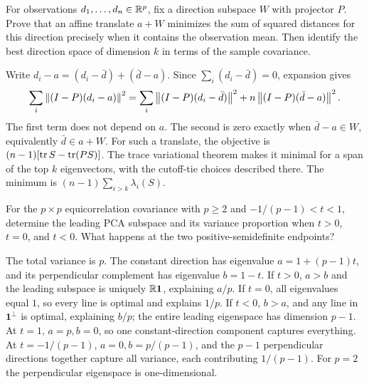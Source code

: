 \begin{problem}
For observations $d_1,\ldots,d_n\in\mathbb R^p$, fix a direction subspace $W$
with projector $P$. Prove that an affine translate $a+W$ minimizes the
sum of squared distances for this direction precisely when it contains
the observation mean. Then identify the best direction space of dimension
$k$ in terms of the sample covariance.
\end{problem}
\begin{solution}
Write $d_i-a=(d_i-\bar d)+(\bar d-a)$.
Since $\sum_i(d_i-\bar d)=0$, expansion gives
\[
\sum_i\left\lVert(I-P)(d_i-a)\right\rVert^2
=\sum_i\left\lVert(I-P)(d_i-\bar d)\right\rVert^2
+n\left\lVert(I-P)(\bar d-a)\right\rVert^2.
\]
The first term does not depend on $a$. The second is zero exactly when
$\bar d-a\in W$, equivalently $\bar d\in a+W$.
For such a translate, the objective is
$(n-1)[\operatorname{tr} S-\operatorname{tr}(PS)]$.
The trace variational theorem makes it minimal for a span of the top
$k$ eigenvectors, with the cutoff-tie choices described there.
The minimum is $(n-1)\sum_{i>k}\lambda_i(S)$.
\end{solution}

\begin{problem}
For the $p\times p$ equicorrelation covariance with $p\geqslant2$ and
$-1/(p-1)<t<1$, determine the leading PCA subspace and its variance
proportion when $t>0$, $t=0$, and $t<0$. What happens at the two
positive-semidefinite endpoints?
\end{problem}
\begin{solution}
The total variance is $p$. The constant direction has eigenvalue
$a=1+(p-1)t$, and its perpendicular complement has eigenvalue $b=1-t$.
If $t>0$, $a>b$ and the leading subspace is uniquely
$\mathbb R\mathbf1$, explaining $a/p$.
If $t=0$, all eigenvalues equal $1$, so every line is optimal and explains
$1/p$. If $t<0$, $b>a$, and any line in $\mathbf1^\perp$ is optimal,
explaining $b/p$; the entire leading eigenspace has dimension $p-1$.
At $t=1$, $a=p,b=0$, so one constant-direction component captures
everything. At $t=-1/(p-1)$, $a=0,b=p/(p-1)$, and the $p-1$
perpendicular directions together capture all variance, each contributing
$1/(p-1)$. For $p=2$ the perpendicular eigenspace is one-dimensional.
\end{solution}


